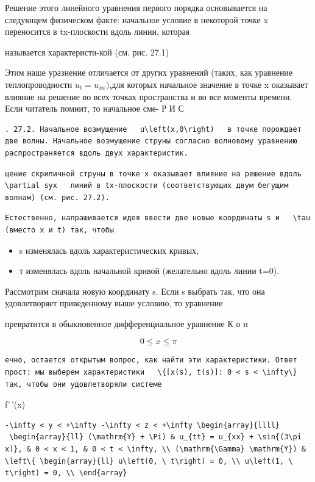 \documentclass[
  ukrainian,
]{article}
\begin{document}
Решение этого линейного уравнения первого порядка основывается на
следующем физическом факте: начальное условие в некоторой точке x
переносится в tx-плоскости вдоль линии, которая

называется характеристи-кой (см. рис. 27.1)

Этим наше уразнение отличается от других уравнений (таких, как уравнение
теплопроводности \(u_t = u_{xx} )\),для которых начальное значение в
точке x оказывает влияние на решение во всех точках пространства и во
все моменты времени. Если читатель помнит, то начальное сме- Р И С

\begin{verbatim}
. 27.2. Начальное возмущение   u\left(x,0\right)   в точке порождает две волны. Начальное возмущение струны согласно волновому уравнению распространяется вдоль двух характеристик.
\end{verbatim}

\begin{verbatim}
щение скрипичной струны в точке x оказывает влияние на решение вдоль   \partial syx   линий в tx-плоскости (соответствующих двум бегущим волнам) (см. рис. 27.2).
\end{verbatim}

\begin{verbatim}
Естественно, напрашивается идея ввести две новые координаты s и   \tau   (вместо x и t) так, чтобы
\end{verbatim}

\begin{itemize}
\item
  s изменялась вдоль характеристических кривых,
\item
  т изменялась вдоль начальной кривой (желательно вдоль линии t=0).
\end{itemize}

Рассмотрим сначала новую координату s. Если s выбрать так, что она
удовлетворяет приведенному выше условию, то уравнение

превратится в обыкновенное дифференциальное уравнение К о н

\[
0 \le x \le \pi
\]

\begin{verbatim}
ечно, остается открытым вопрос, как найти эти характеристики. Ответ прост: мы выберем характеристики   \{[x(s), t(s)]: 0 < s < \infty\}   так, чтобы они удовлетворяли системе
\end{verbatim}

f'\,'(x)

\begin{verbatim}
-\infty < y < +\infty -\infty < z < +\infty \begin{array}{llll}
 \begin{array}{ll} (\mathrm{Y} + \Pi) & u_{tt} = u_{xx} + \sin{(3\pi x)}, & 0 < x < 1, & 0 < t < \infty, \\ (\mathrm{\Gamma} \mathrm{Y}) & \left\{ \begin{array}{ll} u\left(0, \ t\right) = 0, \\ u\left(1, \ t\right) = 0, \\ \end{array}
\end{verbatim}
\end{document}
